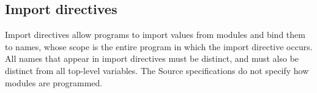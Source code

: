 \subsection*{Import directives}

Import directives allow programs to import values from modules and bind them to names, whose scope
is the entire program in which the import directive occurs.   All names that appear in import directives
must be distinct, and must also be distinct from all top-level variables.  The Source specifications do not specify how modules are
programmed.
